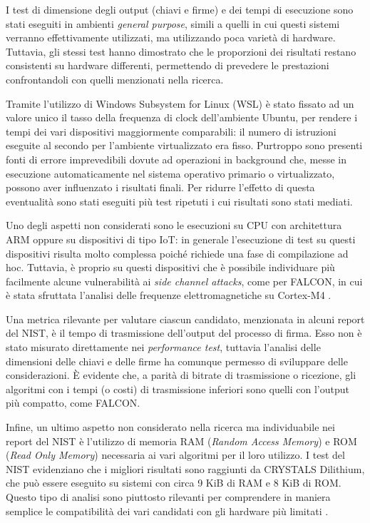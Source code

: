 I test di dimensione degli output (chiavi e firme) e dei tempi di esecuzione sono stati eseguiti in ambienti \textit{general purpose}, simili a quelli in cui questi sistemi verranno effettivamente utilizzati, ma utilizzando poca varietà di hardware. Tuttavia, gli stessi test hanno dimostrato che le proporzioni dei risultati restano consistenti su hardware differenti, permettendo di prevedere le prestazioni confrontandoli con quelli menzionati nella ricerca.

Tramite l'utilizzo di Windows Subsystem for Linux (WSL) è stato fissato ad un valore unico il tasso della frequenza di clock dell'ambiente Ubuntu, per rendere i tempi dei vari dispositivi maggiormente comparabili: il numero di istruzioni eseguite al secondo per l'ambiente virtualizzato era fisso. Purtroppo sono presenti fonti di errore imprevedibili dovute ad operazioni in background che, messe in esecuzione automaticamente nel sistema operativo primario o virtualizzato, possono aver influenzato i risultati finali. Per ridurre l'effetto di questa eventualità sono stati eseguiti più test ripetuti i cui risultati sono stati mediati.

Uno degli aspetti non considerati sono le esecuzioni su CPU con architettura ARM oppure su dispositivi di tipo IoT: in generale l'esecuzione di test su questi dispositivi risulta molto complessa poiché richiede una fase di compilazione ad hoc. Tuttavia, è proprio su questi dispositivi che è possibile individuare più facilmente alcune vulnerabilità ai \textit{side channel attacks}, come per FALCON, in cui è stata sfruttata l'analisi delle frequenze elettromagnetiche su Cortex-M4 \cite{falcon-sidechannel-attack}.

Una metrica rilevante per valutare ciascun candidato,  menzionata in alcuni report del NIST, è il tempo di trasmissione dell'output del processo di firma. Esso non è stato misurato direttamente nei \textit{performance test}, tuttavia l'analisi delle dimensioni delle chiavi e delle firme ha comunque permesso di sviluppare delle considerazioni. È evidente che, a parità di bitrate di trasmissione o ricezione, gli algoritmi con i tempi (o costi) di trasmissione inferiori sono quelli con l'output più compatto, come FALCON.

Infine, un ultimo aspetto non considerato nella ricerca ma individuabile nei report del NIST è l'utilizzo di memoria RAM (\textit{Random Access Memory}) e ROM (\textit{Read Only Memory}) necessaria ai vari algoritmi per il loro utilizzo. I test del NIST evidenziano che i migliori risultati sono raggiunti da CRYSTALS Dilithium, che può essere eseguito su sistemi con circa 9 KiB di RAM e 8 KiB di ROM. Questo tipo di analisi sono piuttosto rilevanti per comprendere in maniera semplice le compatibilità dei vari candidati con gli hardware più limitati \cite{NISTthirdReport}.

